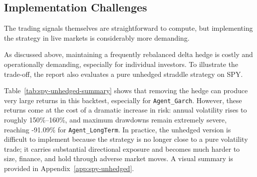 ﻿\documentclass{article}
\begin{document}
\subsection{Implementation Challenges}

The trading signals themselves are straightforward to compute, but implementing the strategy in live markets is considerably more demanding.

As discussed above, maintaining a frequently rebalanced delta hedge is costly and operationally demanding, especially for individual investors. To illustrate the trade-off, the report also evaluates a pure unhedged straddle strategy on SPY.

\begin{table}[H]
\centering
\footnotesize
\caption{SPY performance summary for the unhedged straddle strategy.}
\label{tab:spy-unhedged-summary}
\end{table}

Table~\ref{tab:spy-unhedged-summary} shows that removing the hedge can produce very large returns in this backtest, especially for \texttt{Agent\_Garch}. However, these returns come at the cost of a dramatic increase in risk: annual volatility rises to roughly 150\%--160\%, and maximum drawdowns remain extremely severe, reaching -91.09\% for \texttt{Agent\_LongTerm}. In practice, the unhedged version is difficult to implement because the strategy is no longer close to a pure volatility trade; it carries substantial directional exposure and becomes much harder to size, finance, and hold through adverse market moves. A visual summary is provided in Appendix~\ref{app:spy-unhedged}.
\end{document}
